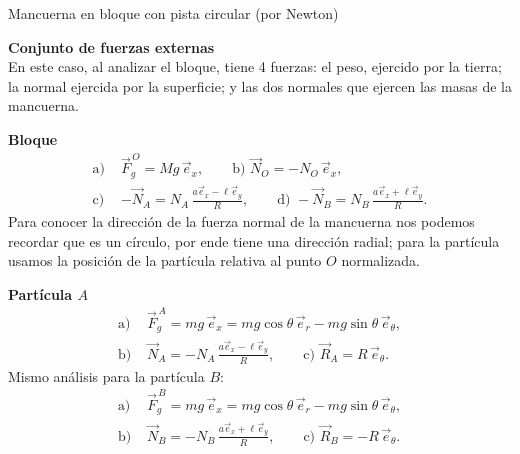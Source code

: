 \begin{solucion}{Mancuerna en bloque con pista circular (por Newton)}
\begin{center}
\end{center}

\textbf{Conjunto de fuerzas externas}\\
En este caso, al analizar el bloque, tiene 4 fuerzas: el peso, ejercido por la tierra; la normal ejercida por la superficie; y las dos normales que ejercen las masas de la mancuerna.

\textbf{Bloque}
$$\begin{aligned}
\text{a) }&\vec{F}^{\,O}_g = M g\,\vec{e}_x, \qquad
\text{b) } \vec{N}_O = -N_O\,\vec{e}_x,\\
\text{c) }&-\vec{N}_A = N_A\,\frac{a\vec{e}_x-\ell\vec{e}_y}{R}, \qquad
\text{d) } -\vec{N}_B = N_B\,\frac{a\vec{e}_x+\ell\vec{e}_y}{R}.
\end{aligned}$$
Para conocer la dirección de la fuerza normal de la mancuerna nos podemos recordar que es un círculo, por ende tiene una dirección radial; para la partícula usamos la posición de la partícula relativa al punto $O$ normalizada.

\textbf{Partícula $A$}
$$\begin{aligned}
\text{a) }&\vec{F}^{\,A}_g = m g\,\vec{e}_x = m g\cos\theta\,\vec{e}_r - m g\sin\theta\,\vec{e}_\theta,\\
\text{b) }&\vec{N}_A = -N_A\,\frac{a\vec{e}_x-\ell\vec{e}_y}{R},\qquad
\text{c) } \vec{R}_A= R\,\vec{e}_\theta.
\end{aligned}$$
Mismo análisis para la partícula $B$:
$$\begin{aligned}
\text{a) }&\vec{F}^{\,B}_g = m g\,\vec{e}_x = m g\cos\theta\,\vec{e}_r - m g\sin\theta\,\vec{e}_\theta,\\
\text{b) }&\vec{N}_B = -N_B\,\frac{a\vec{e}_x+\ell\vec{e}_y}{R},\qquad
\text{c) } \vec{R}_B= -R\,\vec{e}_\theta.
\end{aligned}$$


\end{solucion}

